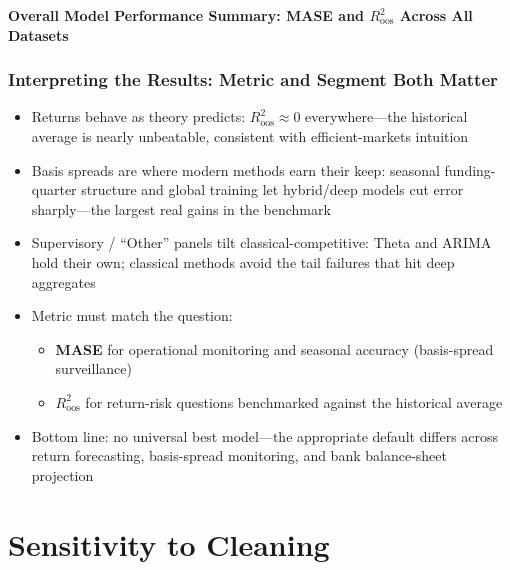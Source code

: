 \documentclass[ignorenonframetext, 9pt]{beamer}
\begin{document}
\begin{frame}[plain]
    \tiny
    \vspace{-0.2cm}
    \centering
    \textbf{Overall Model Performance Summary: MASE and $R^2_{\text{oos}}$ Across All Datasets}\\
    \vspace{0.2cm}
    \resizebox{0.98\textwidth}{!}{}
  \end{frame}

\begin{frame}
  \frametitle{Interpreting the Results: Metric and Segment Both Matter}
  \begin{itemize}
  \item \alert{Returns behave as theory predicts:} $R^2_{\text{oos}}\approx 0$ everywhere---the historical average is nearly unbeatable, consistent with efficient-markets intuition
  \vspace{0.25cm}
  \item \alert{Basis spreads are where modern methods earn their keep:} seasonal funding-quarter structure and global training let hybrid/deep models cut error sharply---the largest real gains in the benchmark
  \vspace{0.25cm}
  \item \alert{Supervisory / ``Other'' panels tilt classical-competitive:} Theta and ARIMA hold their own; classical methods avoid the tail failures that hit deep aggregates
  \vspace{0.25cm}
  \item \alert{Metric must match the question:}
  \begin{itemize}
    \item \textbf{MASE} for operational monitoring and seasonal accuracy (basis-spread surveillance)
    \item \textbf{$R^2_{\text{oos}}$} for return-risk questions benchmarked against the historical average
  \end{itemize}
  \vspace{0.25cm}
  \item \alert{Bottom line:} no universal best model---the appropriate default differs across return forecasting, basis-spread monitoring, and bank balance-sheet projection
  \end{itemize}
\end{frame}

\section{Sensitivity to Cleaning}
\end{document}
